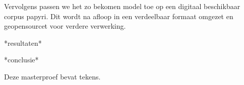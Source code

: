 Vervolgens passen we het zo bekomen model toe op een digitaal
beschikbaar corpus papyri. Dit wordt na afloop in een verdeelbaar
formaat omgezet en geopensourcet voor verdere verwerking.

*resultaten*

*conclusie*







\endgroup			

\vfill
Deze masterproef bevat \textbf{} tekens.

